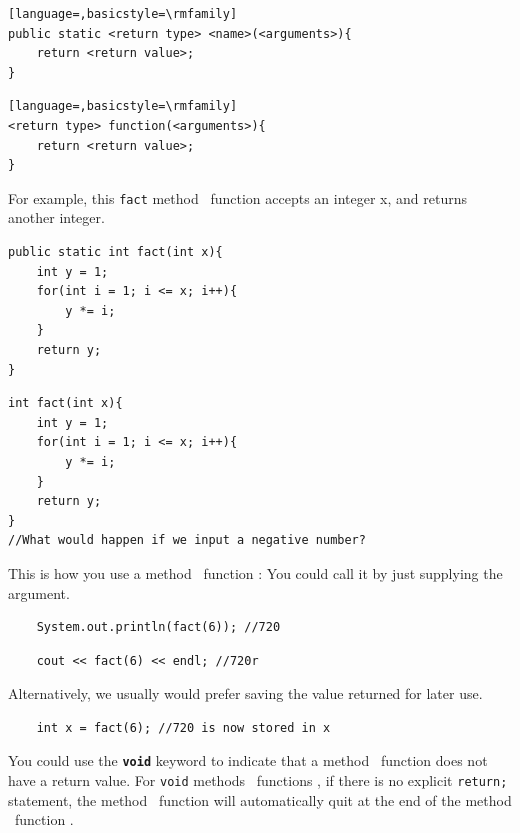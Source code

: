 \if{}
\begin{lstlisting}[language=,basicstyle=\rmfamily]
public static <return type> <name>(<arguments>){
    return <return value>;
}
\end{lstlisting}
\else
\begin{lstlisting}[language=,basicstyle=\rmfamily]
<return type> function(<arguments>){
    return <return value>;
}
\end{lstlisting}
\fi

For example, this \texttt{fact}\if{} method \else ~function \fi accepts an integer x, and returns another integer.
\if{}
\begin{lstlisting}
public static int fact(int x){
    int y = 1;
    for(int i = 1; i <= x; i++){
        y *= i;
    }
    return y;
}
\end{lstlisting}
\else
\begin{lstlisting}
int fact(int x){
    int y = 1;
    for(int i = 1; i <= x; i++){
        y *= i;
    }
    return y;
}
//What would happen if we input a negative number?
\end{lstlisting}
\fi

This is how you use a\if{} method \else ~function \fi: 
You could call it by just supplying the argument.

\if{}
\begin{lstlisting}
    System.out.println(fact(6)); //720
\end{lstlisting}
\else
\begin{lstlisting}
    cout << fact(6) << endl; //720r
\end{lstlisting}
\fi

Alternatively, we usually would prefer saving the value returned for later use.

\begin{lstlisting}
    int x = fact(6); //720 is now stored in x
\end{lstlisting}

You could use the \texttt{\textbf{void}} keyword to indicate that a\if{} method \else ~function \fi does not have a return value. For \texttt{void}\if{} methods \else ~functions \fi, if there is no explicit \texttt{return;} statement, the\if{} method \else ~function \fi will automatically quit at the end of the\if{} method \else ~function \fi. 

